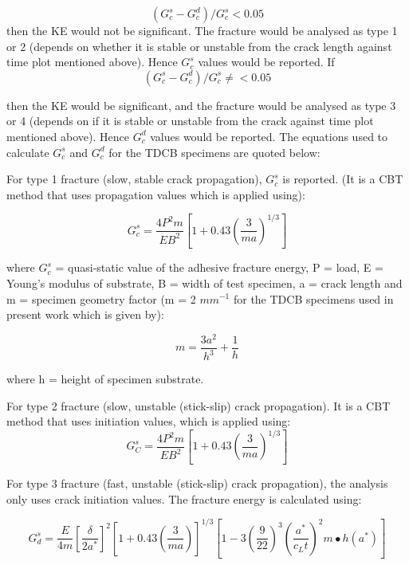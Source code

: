 \documentclass[numbers=noendperiod,chapterprefix=on]{icldt} %
\begin{document}
\begin{equation} 
(G_c^s  - G_c^d)/G_c^s< 0.05
\end{equation}
then the KE would not be significant. The fracture would be analysed as type 1 or 2 (depends on whether it is stable or unstable from the crack length against time plot mentioned above). Hence $G^s_c$ values would be reported.
If
\begin{equation} 
(G_c^s  - G_c^d)/G_c^s\neq< 0.05
\end{equation}

then the KE would be significant, and the fracture would be analysed as type 3 or 4 (depends on if it is stable or unstable from the crack against time plot mentioned above). Hence $G^d_c$ values would be reported. The equations used to calculate $G^s_c$ and $G^d_c$ for the TDCB specimens \cite{Blackman1995} are quoted below: 

For type 1 fracture (slow, stable crack propagation), $ G_c^s $ is reported. (It is a CBT method that uses propagation values which is applied using): 

\begin{equation} 
G_c^s = \frac{4P^2 m}{EB^2} \left[1+0.43\left( \frac{3}{ma}\right)^{1/3} \right ] 
\end{equation}

where $G^s_c$ = quasi-static value of the adhesive fracture energy, P = load, E = Young's modulus of substrate, B = width of test specimen, a = crack length and m = specimen geometry factor (m = 2 $ mm^{-1} $ for the TDCB specimens used in present work which is given by):


\begin{equation} 
m=\frac{3a^2}{h^3}+\frac{1}{h}
\end{equation}

where h = height of specimen substrate.

For type 2 fracture (slow, unstable (stick-slip) crack propagation). It is a CBT method that uses initiation values, which is applied using:
\begin{equation} 
G_C^s=\frac{4P^2m}{EB^2}\left[1+0.43\left(\frac{3}{ma}\right) ^{1/3} \right]
\end{equation}

For type 3 fracture (fast, unstable (stick-slip) crack propagation), the analysis only uses crack initiation values. The fracture energy is calculated using:

\begin{equation} 
G_d^s= \frac{E}{4m}\left[\frac{\delta}{2a^{\ast}}\right]^2 \left[1+0.43 \left(\frac{3}{ma}\right)\right]^{1/3} 
\left[1-3 \left(\frac{9}{22}\right) ^3
\left(\frac{a^*}{c_L t}\right) ^2 m∙h(a^*)\right]
\end{equation}
\end{document}
